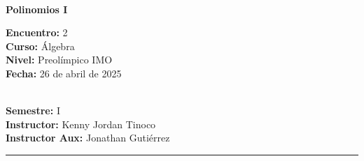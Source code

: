 \begin{center}
    \ \\
    \vspace{-4mm}
    \textbf{\Large Polinomios I}
\end{center}
\vspace{-5mm}
\begin{multicols}{2}
{
    \textbf{Encuentro:} 2\\
    \textbf{Curso:} Álgebra\\
    \textbf{Nivel:} Preolímpico IMO\\
    \textbf{Fecha:} 26 de abril de 2025\\
    \begin{flushright}
        \ \\
        \textbf{Semestre:} I\\
        \textbf{Instructor:} Kenny Jordan Tinoco\\
        \textbf{Instructor Aux:} Jonathan Gutiérrez
    \end{flushright}
}
\end{multicols}
\vspace{-4mm}
\hrule
\tableofcontents

\thispagestyle{first-page-style}